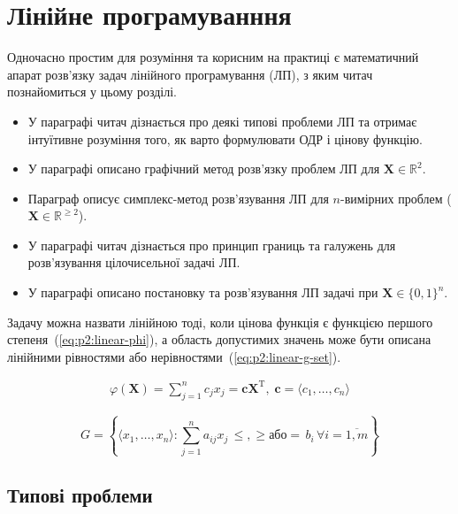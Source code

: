 \documentclass[\main/book.tex]{subfiles}
\begin{document}
\chapter{Лінійне програмуванння}

Одночасно простим для розуміння та корисним на практиці є математичний апарат розв'язку задач лінійного програмування (ЛП), з яким читач познайомиться у цьому розділі.

\begin{itemize}
 \item У параграфі  читач дізнається про деякі типові проблеми ЛП та отримає інтуїтивне розуміння того, як варто формулювати ОДР і цінову функцію.
 \item У параграфі  описано графічний метод розв'язку проблем ЛП для $\mathbf{X} \in \mathbb{R}^2$.
 \item Параграф  описує симплекс-метод розв'язування ЛП для $n$-вимірних проблем ($\mathbf{X} \in \mathbb{R}^{\geq 2}$).
 \item У параграфі  читач дізнається про принцип границь та галужень для розв'язування цілочисельної задачі ЛП.
 \item У параграфі  описано постановку та розв'язування ЛП задачі при $\mathbf{X} \in \{0,1\}^n$.
\end{itemize}

Задачу можна назвати лінійною тоді, коли цінова функція є функцією першого степеня~(\ref{eq:p2:linear-phi}), а область допустимих значень може бути описана лінійними рівностями або нерівностями~(\ref{eq:p2:linear-g-set}).

\begin{equation}
\begin{split}
 \varphi(\mathbf{X}) =
 \sum_{j=1}^n c_j x_j =
 \mathbf{c} \mathbf{X}^\mathrm{T},\;
 \mathbf{c} = \langle c_1, \ldots, c_n \rangle
\end{split}
\label{eq:p2:linear-phi}
\end{equation}

\begin{equation}
 G = \left\{
  \langle x_1, \ldots, x_n \rangle:
  \sum_{j=1}^n a_{ij} x_j\,
   \boxed{\leq, \geq \text{або} =}\,
  b_i
  \,\forall i = \overline{1, m}
 \right\}
 \label{eq:p2:linear-g-set}
\end{equation}

\section{Типові проблеми}
\label{section:linear:typical}
\end{document}
